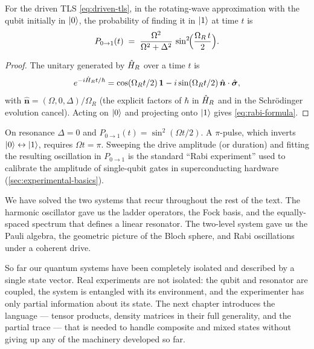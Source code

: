 \begin{theorem}
\label{thm:rabi}
For the driven TLS \cref{eq:driven-tls}, in the rotating-wave
approximation with the qubit initially in $\ket{0}$, the probability
of finding it in $\ket{1}$ at time $t$ is
\begin{equation}
\label{eq:rabi-formula}
P_{0\to 1}(t) \;=\; \frac{\Omega^2}{\Omega^2+\Delta^2}\,
\sin^2\!\Bigl(\frac{\Omega_R\,t}{2}\Bigr).
\end{equation}
\end{theorem}

\begin{proof}
The unitary generated by $\hat{H}_R$ over a time $t$ is
\begin{equation}
e^{-i\hat{H}_R t/\hbar}
= \cos(\Omega_R t/2)\,\mathbf{1} - i\sin(\Omega_R t/2)\,\hat{\bm{n}}\cdot\hat{\bm{\sigma}},
\end{equation}
with $\hat{\bm{n}}=(\Omega,0,\Delta)/\Omega_R$ (the explicit factors of
$\hbar$ in $\hat{H}_R$ and in the Schr\"odinger evolution cancel). Acting
on $\ket{0}$ and projecting onto $\ket{1}$ gives \cref{eq:rabi-formula}.
\end{proof}

\begin{example}
On resonance $\Delta=0$ and $P_{0\to1}(t)=\sin^2(\Omega t/2)$. A
$\pi$-pulse, which inverts $\ket{0}\leftrightarrow\ket{1}$, requires
$\Omega t=\pi$. Sweeping the drive amplitude (or duration) and
fitting the resulting oscillation in $P_{0\to1}$ is the standard
``Rabi experiment'' used to calibrate the amplitude of single-qubit
gates in superconducting hardware (\cref{sec:experimental-basics}).
\end{example}

We have solved the two systems that recur throughout the rest of
the text. The harmonic oscillator gave us the ladder operators,
the Fock basis, and the equally-spaced spectrum that defines a
linear resonator. The two-level system gave us the Pauli algebra,
the geometric picture of the Bloch sphere, and Rabi oscillations
under a coherent drive.

So far our quantum systems have been completely isolated and
described by a single state vector. Real experiments are not
isolated: the qubit and resonator are coupled, the system is
entangled with its environment, and the experimenter has only
partial information about its state. The next chapter introduces
the language --- tensor products, density matrices in their full
generality, and the partial trace --- that is needed to handle
composite and mixed states without giving up any of the machinery
developed so far.

